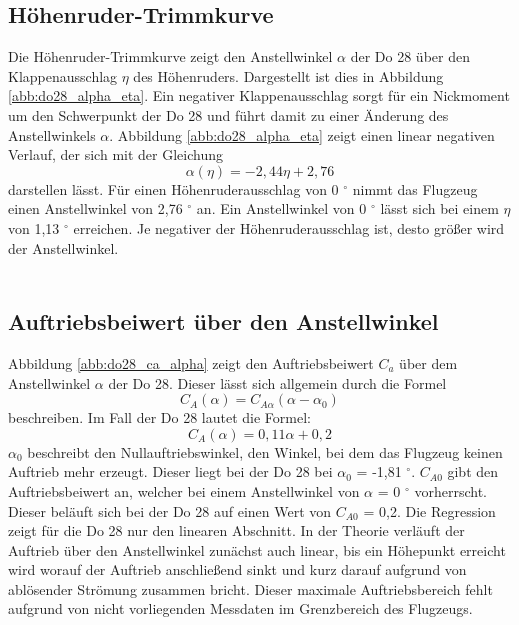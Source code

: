 \subsection{Höhenruder-Trimmkurve}
Die Höhenruder-Trimmkurve zeigt den Anstellwinkel $\alpha$ der Do 28 über den Klappenausschlag $\eta$ des Höhenruders. Dargestellt ist dies in Abbildung \ref{abb:do28_alpha_eta}. Ein negativer Klappenausschlag sorgt für ein Nickmoment um den Schwerpunkt der Do 28 und führt damit zu einer Änderung des Anstellwinkels $\alpha$. Abbildung \ref{abb:do28_alpha_eta} zeigt einen linear negativen Verlauf, der sich mit der Gleichung
\begin{equation}
\alpha(\eta) = -2,44\eta + 2,76
\end{equation}
darstellen lässt. Für einen Höhenruderausschlag von 0 $^\circ$ nimmt das Flugzeug einen Anstellwinkel von 2,76 $^\circ$ an. Ein Anstellwinkel von 0 $^\circ$ lässt sich bei einem $\eta$ von 1,13 $^\circ$ erreichen. Je negativer der Höhenruderausschlag ist, desto größer wird der Anstellwinkel.
 \\\\
\subsection{Auftriebsbeiwert über den Anstellwinkel}
Abbildung \ref{abb:do28_ca_alpha} zeigt den Auftriebsbeiwert $C_a$ über dem Anstellwinkel $\alpha$ der Do 28. Dieser lässt sich allgemein durch die Formel
\begin{equation}  \label{eq:theorie_ca}
C_A(\alpha) = C_{A\alpha}(\alpha - \alpha_0)
\end{equation}
beschreiben. Im Fall der Do 28 lautet die Formel:
\begin{equation}  \label{eq:versuch_ca}
C_A(\alpha) = 0,11\alpha + 0,2
\end{equation}
$\alpha_{0}$ beschreibt den Nullauftriebswinkel, den Winkel, bei dem das Flugzeug keinen Auftrieb mehr erzeugt. Dieser liegt bei der Do 28 bei $\alpha_{0}$ = -1,81 $^\circ$. $C_{A0}$ gibt den Auftriebsbeiwert an, welcher bei einem Anstellwinkel von $\alpha$ = 0 $^\circ$ vorherrscht. Dieser beläuft sich bei der Do 28 auf einen Wert von $C_{A0}$ = 0,2. Die Regression zeigt für die Do 28 nur den linearen Abschnitt. In der Theorie verläuft der Auftrieb über den Anstellwinkel zunächst auch linear, bis ein Höhepunkt erreicht wird worauf der Auftrieb anschließend sinkt und kurz darauf aufgrund von ablösender Strömung zusammen bricht.  
Dieser maximale Auftriebsbereich fehlt aufgrund von nicht vorliegenden Messdaten im Grenzbereich des Flugzeugs. 
\\\\
